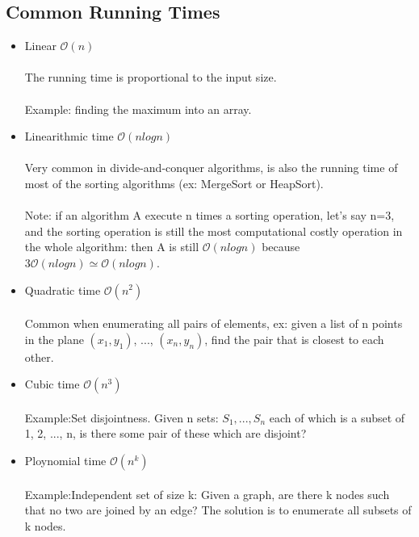 \subsection{Common Running Times}

\begin{itemize}

    \item {Linear $\mathcal{O}{(n)}$}\\\\
          The running time is proportional to the input size.\\\\
          Example: finding the maximum into an array.

    \item {Linearithmic time $\mathcal{O}{(nlogn)}$}\\\\
          Very common in divide-and-conquer algorithms, is also the running time of most of the sorting algorithms (ex: MergeSort or HeapSort).\\\\
          Note: if an algorithm A execute n times a sorting operation, let's say n=3, and the sorting operation is still the most computational costly operation in the whole algorithm: then A is still $\mathcal{O}{(nlogn)}$ because $3\mathcal{O}{(nlogn)} \simeq \mathcal {O}{(nlogn)}$.

    \item {Quadratic time $\mathcal{O}{(n^{2})}$}\\\\
          Common when enumerating all pairs of elements, ex: given a list of n points in the plane $(x_{1}, y_{1})$, ..., $(x_{n}, y_{n})$, find the pair that is closest to each other.

    \item {Cubic time $\mathcal{O}{(n^{3})}$}\\\\
          Example:Set disjointness. Given n sets: $S_{1}, ..., S_{n}$ each of which is a subset of 1, 2, ..., n, is there some pair of these which are disjoint?

    \item {Ploynomial time $\mathcal{O}{(n^{k})}$}\\\\
          Example:Independent set of size k: Given a graph, are there k nodes such that no two are joined by an edge? The solution is to enumerate all subsets of k nodes.


\end{itemize}
